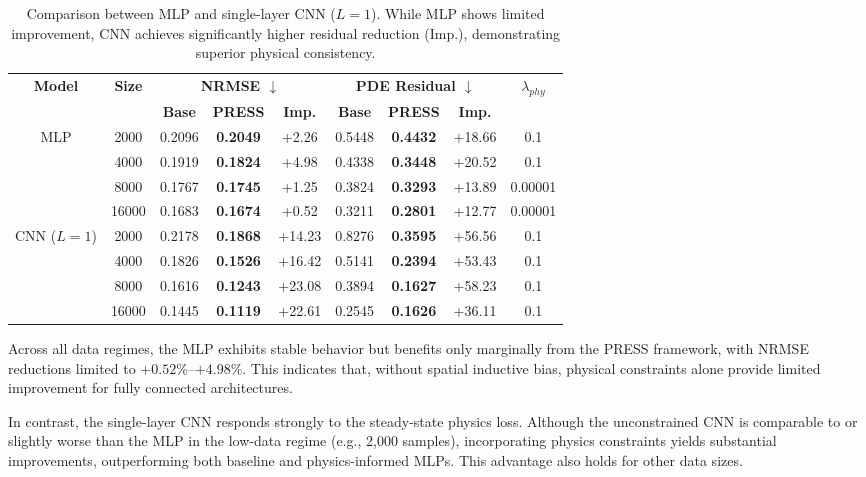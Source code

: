 \documentclass{article} %
\begin{document}
\begin{table}[ht]
\centering
\footnotesize
\caption{Comparison between MLP and single-layer CNN ($L=1$). While MLP shows limited improvement, CNN achieves significantly higher residual reduction (Imp.), demonstrating superior physical consistency.}
\label{tab:mlp_vs_cnn}
\vspace{0.3cm}
\begin{tabular}{ccccccccc}
\toprule
\textbf{Model} & \textbf{Size} &
\multicolumn{3}{c}{\textbf{NRMSE $\downarrow$}} &
\multicolumn{3}{c}{\textbf{PDE Residual $\downarrow$}} &
\textbf{$\lambda_{phy}$} \\
\cmidrule(lr){3-5} \cmidrule(lr){6-8}
 & & \textbf{Base} & \textbf{PRESS} & \textbf{Imp.} & \textbf{Base} & \textbf{PRESS} & \textbf{Imp.} & \\
\midrule
\multirow{4}{*}{MLP}
  & 2000  & 0.2096 & \textbf{0.2049} & +2.26  & 0.5448 & \textbf{0.4432} & +18.66 & 0.1 \\
& 4000  & 0.1919 & \textbf{0.1824} & +4.98  & 0.4338 & \textbf{0.3448} & +20.52 & 0.1 \\
& 8000  & 0.1767 & \textbf{0.1745} & +1.25  & 0.3824 & \textbf{0.3293} & +13.89 & 0.00001 \\
& 16000 & 0.1683 & \textbf{0.1674} & +0.52  & 0.3211 & \textbf{0.2801} & +12.77 & 0.00001 \\
\midrule
\multirow{4}{*}{CNN ($L=1$)}
  & 2000  & 0.2178 & \textbf{0.1868} & +14.23 & 0.8276 & \textbf{0.3595} & +56.56 & 0.1 \\
& 4000  & 0.1826 & \textbf{0.1526} & +16.42 & 0.5141 & \textbf{0.2394} & +53.43 & 0.1 \\
& 8000  & 0.1616 & \textbf{0.1243} & +23.08 & 0.3894 & \textbf{0.1627} & +58.23 & 0.1 \\
& 16000 & 0.1445 & \textbf{0.1119} & +22.61 & 0.2545 & \textbf{0.1626} & +36.11 & 0.1 \\
\bottomrule
\end{tabular}%
\end{table}

Across all data regimes, the MLP exhibits stable behavior but benefits only marginally from the PRESS framework, with NRMSE reductions limited to $+0.52\%$–$+4.98\%$. This indicates that, without spatial inductive bias, physical constraints alone provide limited improvement for fully connected architectures.

In contrast, the single-layer CNN responds strongly to the steady-state physics loss. Although the unconstrained CNN is comparable to or slightly worse than the MLP in the low-data regime (e.g., 2,000 samples), incorporating physics constraints yields substantial improvements, outperforming both baseline and physics-informed MLPs. This advantage also holds for other data sizes.
\end{document}
